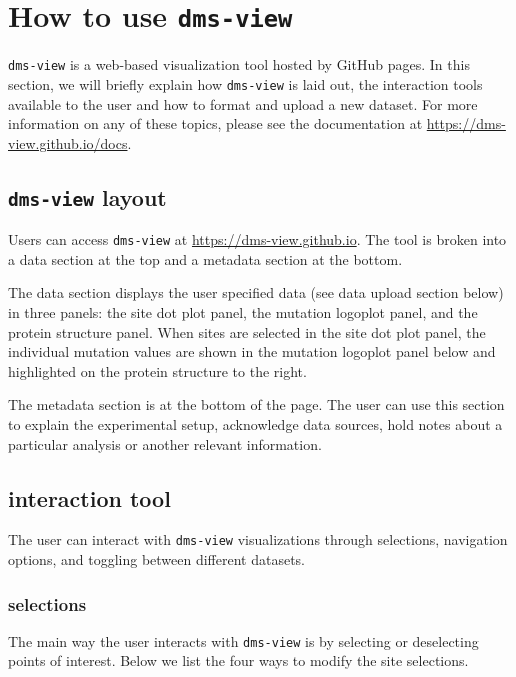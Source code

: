 \section{How to use \texttt{dms-view}}

\texttt{dms-view} is a web-based visualization tool hosted by GitHub pages.
In this section, we will briefly explain how \texttt{dms-view} is laid out, the interaction tools available to the user and how to format and upload a new dataset.
For more information on any of these topics, please see the documentation at \url{https://dms-view.github.io/docs}.

\subsection{\texttt{dms-view} layout}

Users can access \texttt{dms-view} at \url{https://dms-view.github.io}.
The tool is broken into a data section at the top and a metadata section at the bottom.

The data section displays the user specified data (see data upload section below) in three panels: the site dot plot panel, the mutation logoplot panel, and the protein structure panel.
When sites are selected in the site dot plot panel, the individual mutation values are shown in the mutation logoplot panel below and highlighted on the protein structure to the right.

The metadata section is at the bottom of the page.
The user can use this section to explain the experimental setup, acknowledge data sources, hold notes about a particular analysis or another relevant information.

\subsection{interaction tool}

The user can interact with \texttt{dms-view} visualizations through selections, navigation options, and toggling between different datasets.

\subsubsection{selections}

The main way the user interacts with \texttt{dms-view} is by selecting or deselecting points of interest.
Below we list the four ways to modify the site selections.

